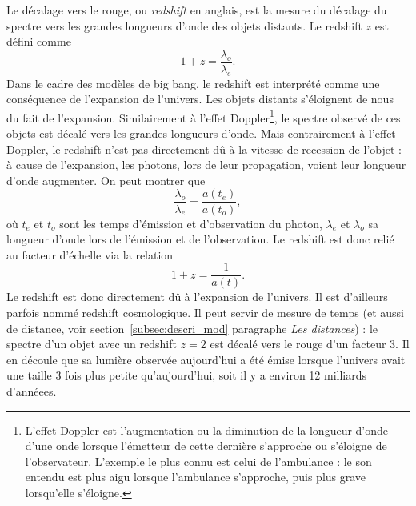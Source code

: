 \documentclass[11pt, twoside, a4paper, openright]{report}
\begin{document}
Le décalage vers le rouge, ou \emph{redshift} en anglais, est la mesure du décalage du spectre vers les grandes longueurs d'onde des objets distants. Le redshift $z$ est défini comme 
\begin{equation}
  \label{eq:redshift}
  1 + z = \frac{\lambda_o}{\lambda_e} .
\end{equation}
Dans le cadre des modèles de big bang, le redshift est interprété comme une conséquence de l'expansion de l'univers.
Les objets distants s'éloignent de nous du fait de l'expansion. Similairement à l'effet Doppler\footnote{L'effet Doppler est l'augmentation ou la diminution de la longueur d'onde d'une onde lorsque l'émetteur de cette dernière s'approche ou s'éloigne de l'observateur. L'exemple le plus connu est celui de l'ambulance : le son entendu est plus aigu lorsque l'ambulance s'approche, puis plus grave lorsqu'elle s'éloigne.}, le spectre observé de ces objets est décalé vers les grandes longueurs d'onde.
Mais contrairement à l'effet Doppler, le redshift n'est pas directement dû à la vitesse de recession de l'objet :
à cause de l'expansion, les photons, lors de leur propagation, voient leur longueur d'onde augmenter.
On peut montrer que
\begin{equation}
  \frac{\lambda_o}{\lambda_e} = \frac{a(t_e)}{a(t_o)} ,
\end{equation}
où $t_e$ et $t_o$ sont les temps d'émission et d'observation du photon, $\lambda_{e}$  et $\lambda_{o}$ sa longueur d'onde lors de l'émission et de l'observation. Le redshift est donc relié au facteur d'échelle via la relation
\begin{equation}
  \label{eq:redshift2}
  1 + z = \frac{1}{a(t)}.
\end{equation} 
Le redshift est donc directement dû à l'expansion de l'univers. Il est d'ailleurs parfois nommé redshift cosmologique. Il peut servir de mesure de temps (et aussi de distance, voir section~\ref{subsec:descri_mod} paragraphe \emph{Les distances}) : le spectre d'un objet avec un redshift $z=2$ est décalé vers le rouge d'un facteur 3. Il en découle que sa lumière observée aujourd'hui a été émise lorsque l'univers avait une taille 3 fois plus petite qu'aujourd'hui, soit il y a environ 12 milliards d'annéees.
\end{document}
